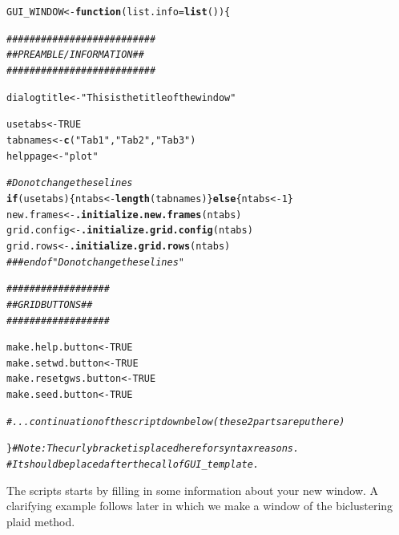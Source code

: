 \documentclass[a4paper]{article}\usepackage[]{graphicx}\usepackage[]{color}
\makeatletter
\newcommand{\hlnum}[1]{\textcolor[rgb]{0.686,0.059,0.569}{#1}}%
\newcommand{\hlstr}[1]{\textcolor[rgb]{0.192,0.494,0.8}{#1}}%
\newcommand{\hlcom}[1]{\textcolor[rgb]{0.678,0.584,0.686}{\textit{#1}}}%
\newcommand{\hlstd}[1]{\textcolor[rgb]{0.345,0.345,0.345}{#1}}%
\newcommand{\hlkwa}[1]{\textcolor[rgb]{0.161,0.373,0.58}{\textbf{#1}}}%
\newcommand{\hlkwb}[1]{\textcolor[rgb]{0.69,0.353,0.396}{#1}}%
\newcommand{\hlkwc}[1]{\textcolor[rgb]{0.333,0.667,0.333}{#1}}%
\newcommand{\hlkwd}[1]{\textcolor[rgb]{0.737,0.353,0.396}{\textbf{#1}}}%
\newenvironment{kframe}{%
 \def\at@end@of@kframe{}%
 \ifinner\ifhmode%
  \def\at@end@of@kframe{\end{minipage}}%
  \begin{minipage}{\columnwidth}%
 \fi\fi%
 \def\FrameCommand##1{\hskip\@totalleftmargin \hskip-\fboxsep
 \colorbox{shadecolor}{##1}\hskip-\fboxsep
     \hskip-\linewidth \hskip-\@totalleftmargin \hskip\columnwidth}%
 \MakeFramed {\advance\hsize-\width
   \@totalleftmargin\z@ \linewidth\hsize
   \@setminipage}}%
 {\par\unskip\endMakeFramed%
 \at@end@of@kframe}
\newenvironment{knitrout}{}{} %
\makeatother
\begin{document}
\begin{knitrout}
\color{fgcolor}\begin{kframe}
\begin{alltt}
\hlstd{GUI_WINDOW} \hlkwb{<-} \hlkwa{function}\hlstd{(}\hlkwc{list.info}\hlstd{=}\hlkwd{list}\hlstd{())\{}

        \hlcom{##########################}
        \hlcom{## PREAMBLE/INFORMATION ##}
        \hlcom{##########################}

        \hlstd{dialogtitle} \hlkwb{<-} \hlstr{"This is the title of the window"}

        \hlstd{usetabs} \hlkwb{<-} \hlnum{TRUE}
        \hlstd{tabnames} \hlkwb{<-} \hlkwd{c}\hlstd{(}\hlstr{"Tab 1"}\hlstd{,}\hlstr{"Tab 2"}\hlstd{,}\hlstr{"Tab 3"}\hlstd{)}
        \hlstd{helppage} \hlkwb{<-} \hlstr{"plot"}

        \hlcom{# Do not change these lines}
        \hlkwa{if}\hlstd{(usetabs)\{ntabs} \hlkwb{<-} \hlkwd{length}\hlstd{(tabnames)\}} \hlkwa{else} \hlstd{\{ntabs} \hlkwb{<-} \hlnum{1}\hlstd{\}}
        \hlstd{new.frames} \hlkwb{<-} \hlkwd{.initialize.new.frames}\hlstd{(ntabs)}
        \hlstd{grid.config} \hlkwb{<-} \hlkwd{.initialize.grid.config}\hlstd{(ntabs)}
        \hlstd{grid.rows} \hlkwb{<-} \hlkwd{.initialize.grid.rows}\hlstd{(ntabs)}
        \hlcom{### end of "Do not change these lines"}

        \hlcom{##################}
        \hlcom{## GRID BUTTONS ##}
        \hlcom{##################}

        \hlstd{make.help.button} \hlkwb{<-} \hlnum{TRUE}
        \hlstd{make.setwd.button} \hlkwb{<-} \hlnum{TRUE}
        \hlstd{make.resetgws.button} \hlkwb{<-} \hlnum{TRUE}
        \hlstd{make.seed.button} \hlkwb{<-} \hlnum{TRUE}

        \hlcom{# ... continuation of the script down below (these 2 parts are put here)	}

\hlstd{\}}       \hlcom{# Note: The curly bracket is placed here for syntax reasons. }
        \hlcom{#       It should be placed after the call of GUI_template.}
\end{alltt}
\end{kframe}
\end{knitrout}
\noindent The scripts starts by filling in some information about your
new window. A clarifying example follows later in which we make a window of the
biclustering plaid method.
\end{document}
